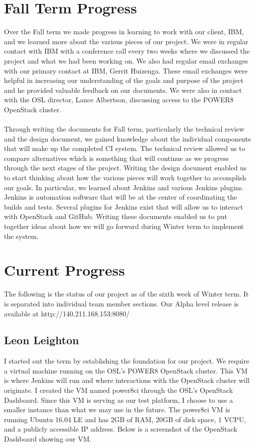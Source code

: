 \documentclass[10pt,onecolumn,journal,draftclsnofoot]{IEEEtran}
\begin{document}
\section{Fall Term Progress}
Over the Fall term we made progress in learning to work with our client, IBM, and we learned more about the various pieces of our project.
We were in regular contact with IBM with a conference call every two weeks where we discussed the project and what we had been working on.
We also had regular email exchanges with our primary contact at IBM, Gerrit Huizenga.
These email exchanges were helpful in increasing our understanding of the goals and purpose of the project and he provided valuable feedback on our documents.
We were also in contact with the OSL director, Lance Albertson, discussing access to the POWER8 OpenStack cluster.
\\
\\
Through writing the documents for Fall term, particularly the technical review and the design document, we gained knowledge about the individual components that will make up the completed CI system.
The technical review allowed us to compare alternatives which is something that will continue as we progress through the next stages of the project.
Writing the design document enabled us to start thinking about how the various pieces will work together to accomplish our goals.
In particular, we learned about Jenkins and various Jenkins plugins.
Jenkins is automation software that will be at the center of coordinating the builds and tests.
Several plugins for Jenkins exist that will allow us to interact with OpenStack and GitHub.
Writing these documents enabled us to put together ideas about how we will go forward during Winter term to implement the system.

\section{Current Progress}
The following is the status of our project as of the sixth week of Winter term. It is separated into individual team member sections. Our Alpha level release is available at http://140.211.168.153:8080/
\subsection{Leon Leighton}
I started out the term by establishing the foundation for our project.
We require a virtual machine running on the OSL's POWER8 OpenStack cluster.
This VM is where Jenkins will run and where interactions with the OpenStack cluster will originate.
I created the VM named power8ci through the OSL's OpenStack Dashboard.
Since this VM is serving as our test platform, I choose to use a smaller instance than what we may use in the future.
The power8ci VM is running Ubuntu 16.04 LE and has 2GB of RAM, 20GB of disk space, 1 VCPU, and a publicly accessible IP address.
Below is a screenshot of the OpenStack Dashboard showing our VM\@.
\end{document}
